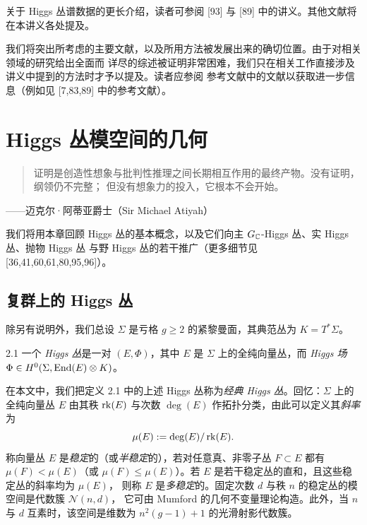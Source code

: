 关于 Higgs 丛谱数据的更长介绍，读者可参阅 [93] 与 [89] 中的讲义。其他文献将在本讲义各处提及。

我们将突出所考虑的主要文献，以及所用方法被发展出来的确切位置。由于对相关领域的研究给出全面而
详尽的综述被证明非常困难，我们只在相关工作直接涉及讲义中提到的方法时才予以提及。读者应参阅
参考文献中的文献以获取进一步信息（例如见 [7,83,89] 中的参考文献）。

\section{Higgs 丛模空间的几何}

\begin{quote}
\kaishu 证明是创造性想象与批判性推理之间长期相互作用的最终产物。没有证明，纲领仍不完整；
但没有想象力的投入，它根本不会开始。
\end{quote}
\begin{flushright}
——迈克尔·阿蒂亚爵士（Sir Michael Atiyah）
\end{flushright}

我们将用本章回顾 Higgs 丛的基本概念，以及它们向主 $G_{\mathbb{C}}$-Higgs 丛、实 Higgs 丛、抛物 Higgs 丛
与野 Higgs 丛的若干推广（更多细节见 [36,41,60,61,80,95,96]）。

\subsection{复群上的 Higgs 丛}

除另有说明外，我们总设 $\Sigma$ 是亏格 $g\ge 2$ 的紧黎曼面，其典范丛为 $K=T^*\Sigma$。

\begin{defn}{2.1}
一个 \emph{Higgs 丛}是一对 $(E,\Phi)$，其中 $E$ 是 $\Sigma$ 上的全纯向量丛，而 \emph{Higgs 场}
$\Phi\in H^0(\Sigma,\operatorname{End}(E)\otimes K)$。
\end{defn}

在本文中，我们把定义 2.1 中的上述 Higgs 丛称为\emph{经典 Higgs 丛}。回忆：$\Sigma$ 上的全纯向量丛
$E$ 由其秩 $\operatorname{rk}(E)$ 与次数 $\deg(E)$ 作拓扑分类，由此可以定义其\emph{斜率}为
\[
  \mu(E) := \deg(E)/\operatorname{rk}(E).
\]
称向量丛 $E$ 是\emph{稳定}的（或\emph{半稳定}的），若对任意真、非零子丛 $F\subset E$ 都有
$\mu(F)<\mu(E)$（或 $\mu(F)\le\mu(E)$）。若 $E$ 是若干稳定丛的直和，且这些稳定丛的斜率均为 $\mu(E)$，
则称 $E$ 是\emph{多稳定}的。固定次数 $d$ 与秩 $n$ 的稳定丛的模空间是代数簇 $\mathcal{N}(n,d)$，
它可由 Mumford 的几何不变量理论构造。此外，当 $n$ 与 $d$ 互素时，该空间是维数为
$n^2(g-1)+1$ 的光滑射影代数簇。

